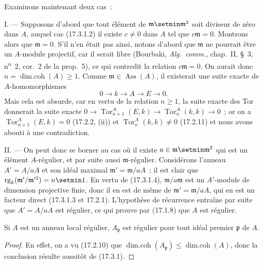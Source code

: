 Examinons maintenant deux cas~:

\medskip\noindent I. --- Supposons d'abord que tout élément de
$\mathfrak{m}\setmin\mathfrak{m}^2$ soit diviseur de zéro dans $A$, auquel cas
(17.3.1.2) il existe $c\neq0$ dans $A$ tel que $c\mathfrak{m}=0$. Montrons
alors que $\mathfrak{m}=0$. S'il n'en était pas ainsi, notons d'abord que
$\mathfrak{m}$ ne pourrait être un $A$-module projectif, car il serait libre
(Bourbaki, \emph{Alg.~comm.}, chap.~II, \S~3, n\textsuperscript{o}~2, cor.~2 de la prop.~5),
ce qui contredit la relation $c\mathfrak{m}=0$. On aurait donc
$n=\operatorname{dim.coh}(A)\geq1$. Comme
$\mathfrak{m}\in\operatorname{Ass}(A)$, il existerait une suite exacte de
$A$-homomorphismes
\[
  0\longrightarrow k\longrightarrow A\longrightarrow E\longrightarrow0.
\]
Mais cela est absurde, car en vertu de la relation $n\geq1$, la suite exacte
des Tor donnerait la suite exacte
$0\longrightarrow\operatorname{Tor}^A_{n+1}(E,k)\longrightarrow
\operatorname{Tor}^A_n(k,k)\longrightarrow0$~; or on a
$\operatorname{Tor}^A_{n+1}(E,k)=0$ (17.2.2, (ii)) et
$\operatorname{Tor}^A_n(k,k)\neq0$ (17.2.11) et nous avons abouti à une
contradiction.

\medskip\noindent II. --- On peut donc se borner au cas où il existe
$a\in\mathfrak{m}\setmin\mathfrak{m}^2$ qui est un élément $A$-régulier, et par
suite aussi $\mathfrak{m}$-régulier. Considérons l'anneau $A'=A/aA$ et son
idéal
maximal $\mathfrak{m}'=\mathfrak{m}/aA$~; il est clair que
$\operatorname{rg}_k(\mathfrak{m}'/\mathfrak{m}'^2)=n\setmin 1$. En vertu de
(17.3.1.4), $\mathfrak{m}/a\mathfrak{m}$ est un $A'$-module de dimension
projective finie, donc il en est de même de
$\mathfrak{m}'=\mathfrak{m}/aA$, qui en est un facteur direct (17.3.1.3 et
17.2.1). L'hypothèse de récurrence entraîne par suite que $A'=A/aA$ est
régulier, ce qui prouve par (17.1.8) que $A$ est régulier.

\begin{corollary}[17.3.2]
\label{0.17.3.2-fr}
Si $A$ est un anneau local régulier, $A_{\mathfrak{p}}$ est régulier pour tout
idéal premier $\mathfrak{p}$ de $A$.
\end{corollary}

\begin{proof}
En effet, on a vu (17.2.10) que
$\operatorname{dim.coh}(A_{\mathfrak{p}})\leq
\operatorname{dim.coh}(A)$, donc la conclusion résulte aussitôt de (17.3.1).
\end{proof}

